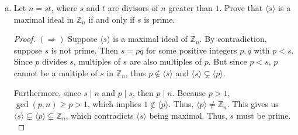 \documentclass[12pt, letterpaper]{article}
\newcommand{\Z}{\mathbb{Z}}
\begin{document}
\begin{enumerate}
\begin{enumerate}[(a)]
        \begin{proof}
            We need to find elements $a, b \in \Z[i]$ such that $ab \in \langle 2 + 2i \rangle$ but $a \notin \langle 2 + 2i \rangle$
            and $b \notin \langle 2 + 2i \rangle$. Consider $a = b = 2$. Then $ab = 4$, and
            \[
                (1 - i)(2 + 2i) = 2 + 2i - 2i - 2i^2 = 2 + 2 = 4
            \]
            so $4 \in \langle 2 + 2i \rangle$. Now suppose $2 \in \langle 2 + 2i \rangle$. Then there exists
            $x + yi \in \Z[i]$ such that $(x + yi)(2 + 2i) = 2$. Expanding,
            \begin{align*}
                (2x - 2y) + (2x + 2y)i &= 2 + 0i
            \end{align*}
            So $2x - 2y = 2$ and $2x + 2y = 0$. Adding these gives $4x = 2$,
            so $x = \frac{1}{2} \notin \Z$, a contradiction. Thus $2 \notin \langle 2 + 2i \rangle$.
            Since $2 \cdot 2 = 4 \in \langle 2 + 2i \rangle$ but $2 \notin \langle 2 + 2i \rangle$,
            $\langle 2 + 2i \rangle$ is not a prime ideal.
        \end{proof}

        \item Let $n = st$, where $s$ and $t$ are divisors of $n$ greater than $1$. Prove that $\langle s \rangle$ is a maximal ideal in $\Z_n$ if and only if $s$ is prime.

        \begin{proof}
            $(\Rightarrow)$ Suppose $\langle s \rangle$ is a maximal ideal of $\Z_n$. By contradiction, suppose $s$ is not prime.
            Then $s = pq$ for some positive integers $p,q$ with $p < s$. Since $p$ divides $s$, multiples of $s$ are also
            multiples of $p$. But since $p < s$, $p$ cannot be a multiple of $s$ in $\Z_n$, thus $p \notin \langle s \rangle$
            and $\langle s \rangle \subsetneq \langle p \rangle$. 

            Furthermore, since $s \mid n$ and $p \mid s$, then $p \mid n$. Because $p > 1$, $\gcd(p, n) \geq p > 1$,
            which implies $1 \notin \langle p \rangle$. Thus, $\langle p \rangle \neq \Z_n$. 
            This gives us $\langle s \rangle \subsetneq \langle p \rangle \subsetneq \Z_n$, which contradicts
             $\langle s \rangle$ being maximal. Thus, $s$ must be prime. \\


\end{proof}
\end{enumerate}
\end{enumerate}
\end{document}
